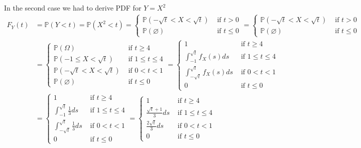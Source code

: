 \documentclass[10pt]{article}
\begin{document}
In the second case we had to derive PDF for $Y=X^2$
\begin{align}
    F_Y(t)
     & =\mathbb{P}(Y<t)
    =\mathbb{P}(X^2<t)
    =\begin{cases}
        \mathbb{P}(-\sqrt{t}<X<\sqrt{t}) & \mbox { if } t>0     \\
        \mathbb{P}(\varnothing)          & \mbox { if } t\leq 0
    \end{cases}
    =\begin{cases}
        \mathbb{P}(-\sqrt{t}<X<\sqrt{t}) & \mbox { if } t>0     \\
        \mathbb{P}(\varnothing)          & \mbox { if } t\leq 0
    \end{cases}    \\
     & =\begin{cases}
        \mathbb{P}(\Omega)               & \mbox { if } t\geq 4       \\
        \mathbb{P}(-1\leq X<\sqrt{t})    & \mbox { if } 1\leq t\leq 4 \\
        \mathbb{P}(-\sqrt{t}<X<\sqrt{t}) & \mbox { if } 0<t<1         \\
        \mathbb{P}(\varnothing)          & \mbox { if } t\leq 0
    \end{cases}
    =\begin{cases}
        1                                   & \mbox { if } t\geq 4       \\
        \int_{-1}^{\sqrt{t}} f_X(s)ds       & \mbox { if } 1\leq t\leq 4 \\
        \int_{-\sqrt{t}}^{\sqrt{t}}f_X(s)ds & \mbox { if } 0<t<1         \\
        0                                   & \mbox { if } t\leq 0
    \end{cases}    \\
     & =\begin{cases}
        1                                        & \mbox { if } t\geq 4       \\
        \int_{-1}^{\sqrt{t}} \frac{1}{3}ds       & \mbox { if } 1\leq t\leq 4 \\
        \int_{-\sqrt{t}}^{\sqrt{t}}\frac{1}{3}ds & \mbox { if } 0<t<1         \\
        0                                        & \mbox { if } t\leq 0
    \end{cases}
    =\begin{cases}
        1                      & \mbox { if } t\geq 4       \\
        \frac{\sqrt{t}+1}{3}ds & \mbox { if } 1\leq t\leq 4 \\
        \frac{2\sqrt{t}}{3}ds  & \mbox { if } 0<t<1         \\
        0                      & \mbox { if } t\leq 0
    \end{cases}    \\
\end{align}
\end{document}

